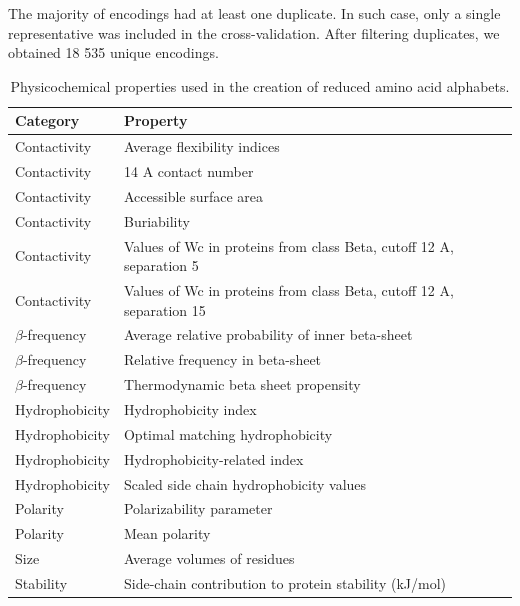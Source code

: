 \documentclass{bioinfo}
\begin{document}
\begin{methods}
  The majority of encodings had at least one duplicate. In such case, only a single 
representative was included in the cross-validation. After filtering duplicates, we 
obtained 18 535 unique encodings.

\begin{table}[bth]
\centering
\begin{tabular}{ll}
  \hline
Category & Property \\ 
  \hline
  Contactivity & Average flexibility indices \citep{bhaskaran_positional_1988} \\ 
  Contactivity & 14 A contact number \citep{nishikawa_radial_1986} \\ 
  Contactivity & Accessible surface area \citep{radzicka_comparing_1988} \\ 
    Contactivity & Buriability \citep{zhou_quantifying_2004} \\ 
  Contactivity & Values of Wc in proteins from class Beta, cutoff 12 A, separation 5 \citep{wozniak_characteristics_2014} \\ 
  Contactivity & Values of Wc in proteins from class Beta, cutoff 12 A, separation 15 \citep{wozniak_characteristics_2014} \\ 
  $\beta$-frequency & Average relative probability of inner beta-sheet \citep{kanehisa_local_1980} \\ 
  $\beta$-frequency & Relative frequency in beta-sheet \citep{prabhakaran_distribution_1990} \\ 
  $\beta$-frequency & Thermodynamic beta sheet propensity \citep{kim_thermodynamic_1993} \\ 
  Hydrophobicity & Hydrophobicity index \citep{argos_structural_1982} \\ 
  Hydrophobicity & Optimal matching hydrophobicity \citep{sweet_correlation_1983} \\ 
  Hydrophobicity & Hydrophobicity-related index \citep{kidera_statistical_1985} \\ 
  Hydrophobicity & Scaled side chain hydrophobicity values \citep{black_development_1991} \\ 
  Polarity & Polarizability parameter \citep{charton_structural_1982} \\ 
  Polarity & Mean polarity \citep{radzicka_comparing_1988} \\ 
  Size & Average volumes of residues \citep{pontius_deviations_1996} \\ 
  Stability & Side-chain contribution to protein stability (kJ/mol) \citep{takano_new_2001} \\ 
   \hline
\end{tabular}
\caption{Physicochemical properties used in the creation of reduced amino acid alphabets.} 
\end{table}


\end{methods}
\end{document}
